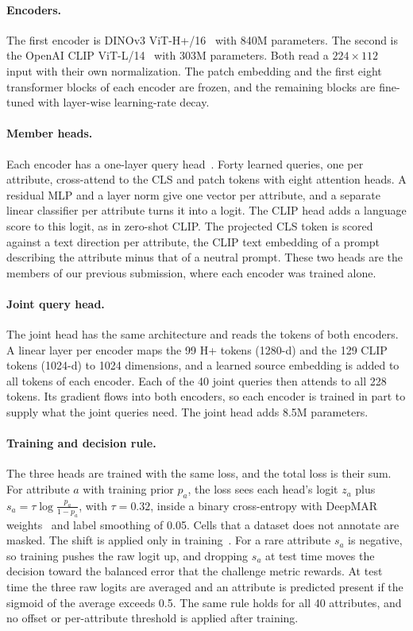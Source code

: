 \documentclass[10pt,twocolumn,letterpaper]{article}
\begin{document}
\paragraph{Encoders.} The first encoder is DINOv3 ViT-H+/16~\cite{dinov3} with 840M parameters. The second is the OpenAI CLIP ViT-L/14~\cite{clip} with 303M parameters. Both read a $224\times112$ input with their own normalization. The patch embedding and the first eight transformer blocks of each encoder are frozen, and the remaining blocks are fine-tuned with layer-wise learning-rate decay.

\paragraph{Member heads.} Each encoder has a one-layer query head~\cite{q2l}. Forty learned queries, one per attribute, cross-attend to the CLS and patch tokens with eight attention heads. A residual MLP and a layer norm give one vector per attribute, and a separate linear classifier per attribute turns it into a logit. The CLIP head adds a language score to this logit, as in zero-shot CLIP. The projected CLS token is scored against a text direction per attribute, the CLIP text embedding of a prompt describing the attribute minus that of a neutral prompt. These two heads are the members of our previous submission, where each encoder was trained alone.

\paragraph{Joint query head.} The joint head has the same architecture and reads the tokens of both encoders. A linear layer per encoder maps the 99 H+ tokens (1280-d) and the 129 CLIP tokens (1024-d) to 1024 dimensions, and a learned source embedding is added to all tokens of each encoder. Each of the 40 joint queries then attends to all 228 tokens. Its gradient flows into both encoders, so each encoder is trained in part to supply what the joint queries need. The joint head adds 8.5M parameters.

\paragraph{Training and decision rule.} The three heads are trained with the same loss, and the total loss is their sum. For attribute $a$ with training prior $p_a$, the loss sees each head's logit $z_a$ plus $s_a=\tau\log\frac{p_a}{1-p_a}$, with $\tau=0.32$, inside a binary cross-entropy with DeepMAR weights~\cite{deepmar} and label smoothing of 0.05. Cells that a dataset does not annotate are masked. The shift is applied only in training~\cite{logitadj}. For a rare attribute $s_a$ is negative, so training pushes the raw logit up, and dropping $s_a$ at test time moves the decision toward the balanced error that the challenge metric rewards. At test time the three raw logits are averaged and an attribute is predicted present if the sigmoid of the average exceeds 0.5. The same rule holds for all 40 attributes, and no offset or per-attribute threshold is applied after training.
\end{document}
